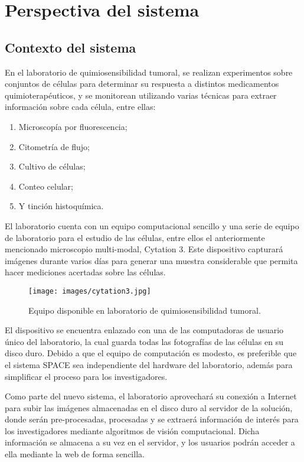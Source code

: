 \documentclass{scrreprt}
\begin{document}
\section{Perspectiva del sistema}

\subsection{Contexto del sistema}
En el laboratorio de quimiosensibilidad tumoral, se realizan experimentos sobre conjuntos de células para determinar su respuesta a distintos medicamentos quimioterapéuticos, y se monitorean utilizando varias técnicas para extraer información sobre cada célula, entre ellas:

\begin{enumerate}[label=\alph*.]
	\item Microscopía por fluorescencia;
    \item Citometría de flujo;
    \item Cultivo de células;
    \item Conteo celular;
    \item Y tinción histoquímica.
\end{enumerate}

El laboratorio cuenta con un equipo computacional sencillo y una serie de equipo de laboratorio para el estudio de las células, entre ellos el anteriormente mencionado microscopio multi-modal, Cytation 3. Este dispositivo capturará imágenes durante varios días para generar una muestra considerable que permita hacer mediciones acertadas sobre las células.

\begin{figure}[H]
	\centering
    \texttt{[image: images/cytation3.jpg]}
    \caption{Equipo disponible en laboratorio de quimiosensibilidad tumoral.}\label{imagenCytation}
\end{figure}

El dispositivo se encuentra enlazado con una de las computadoras de usuario único del laboratorio, la cual guarda todas las fotografías de las células en su disco duro. Debido a que el equipo de computación es modesto, es preferible que el sistema SPACE sea independiente del hardware del laboratorio, además para simplificar el proceso para los investigadores. 

Como parte del nuevo sistema, el laboratorio aprovechará su conexión a Internet para subir las imágenes almacenadas en el disco duro al servidor de la solución, donde serán pre-procesadas, procesadas y se extraerá información de interés para los investigadores mediante algoritmos de visión computacional. Dicha información se almacena a su vez en el servidor, y los usuarios podrán acceder a ella mediante la web de forma sencilla.
\end{document}
